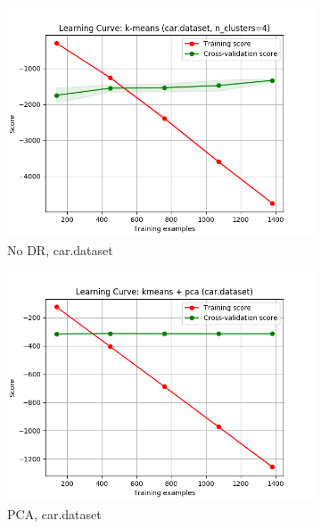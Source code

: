 \documentclass{article}
\begin{document}
    \begin{figure}[htb]
    \centering

      \begin{subfigure}{0.33\textwidth}
        \includegraphics[width=\linewidth]{out/kmeans/car-learning.png}
        \caption{No DR, car.dataset}
      \end{subfigure}\hfil
      \begin{subfigure}{0.33\textwidth}
        \includegraphics[width=\linewidth]{out/cluster_dr/car-kmeans-pca-learning.png}
        \caption{PCA, car.dataset}
      \end{subfigure}\hfil
      \begin{subfigure}{0.33\textwidth}

\end{subfigure}
\end{figure}
\end{document}
